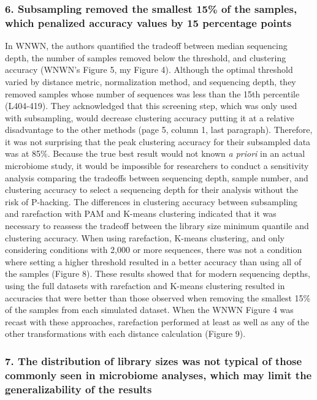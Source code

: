 \documentclass[
]{article}
\begin{document}
\hypertarget{subsampling-removed-the-smallest-15-of-the-samples-which-penalized-accuracy-values-by-15-percentage-points}{%
\subsubsection{6. Subsampling removed the smallest 15\% of the samples,
which penalized accuracy values by 15 percentage
points}\label{subsampling-removed-the-smallest-15-of-the-samples-which-penalized-accuracy-values-by-15-percentage-points}}

In WNWN, the authors quantified the tradeoff between median sequencing
depth, the number of samples removed below the threshold, and clustering
accuracy (WNWN's Figure 5, my Figure 4). Although the optimal threshold
varied by distance metric, normalization method, and sequencing depth,
they removed samples whose number of sequences was less than the 15th
percentile (L404-419). They acknowledged that this screening step, which
was only used with subsampling, would decrease clustering accuracy
putting it at a relative disadvantage to the other methods (page 5,
column 1, last paragraph). Therefore, it was not surprising that the
peak clustering accuracy for their subsampled data was at 85\%. Because
the true best result would not known \emph{a priori} in an actual
microbiome study, it would be impossible for researchers to conduct a
sensitivity analysis comparing the tradeoffs between sequencing depth,
sample number, and clustering accuracy to select a sequencing depth for
their analysis without the risk of P-hacking. The differences in
clustering accuracy between subsampling and rarefaction with PAM and
K-means clustering indicated that it was necessary to reassess the
tradeoff between the library size minimum quantile and clustering
accuracy. When using rarefaction, K-means clustering, and only
considering conditions with 2,000 or more sequences, there was not a
condition where setting a higher threshold resulted in a better accuracy
than using all of the samples (Figure 8). These results showed that for
modern sequencing depths, using the full datasets with rarefaction and
K-means clustering resulted in accuracies that were better than those
observed when removing the smallest 15\% of the samples from each
simulated dataset. When the WNWN Figure 4 was recast with these
approaches, rarefaction performed at least as well as any of the other
transformations with each distance calculation (Figure 9).

\hypertarget{the-distribution-of-library-sizes-was-not-typical-of-those-commonly-seen-in-microbiome-analyses-which-may-limit-the-generalizability-of-the-results}{%
\subsubsection{7. The distribution of library sizes was not typical of
those commonly seen in microbiome analyses, which may limit the
generalizability of the
results}\label{the-distribution-of-library-sizes-was-not-typical-of-those-commonly-seen-in-microbiome-analyses-which-may-limit-the-generalizability-of-the-results}}
\end{document}
